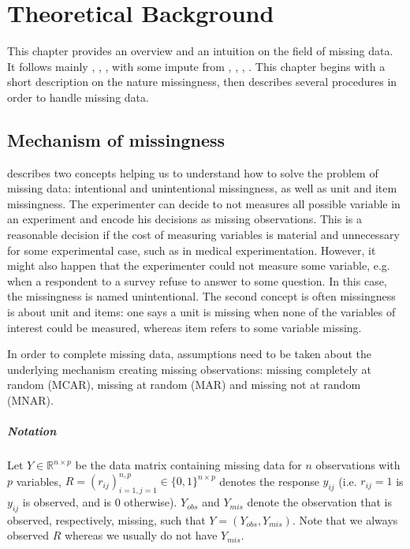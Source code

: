 \chapter{Theoretical Background}

This chapter provides an overview and an intuition on the field of missing
data. It follows mainly \cite{schafer2002missing},
\cite{little2002statistical}, \cite{van2012flexible}, with some impute from
\cite{wikipediaImputation2015}, \cite{matloffblog2015}, \cite{gelman2006data},
\cite{troyanskaya2001missing}. This chapter begins with a short description on
the nature missingness, then describes several procedures in order to handle
missing data.

\section{Mechanism of missingness}
\label{sec:source-missingness}

\cite{van2012flexible} describes two concepts helping us to understand how to
solve the problem of missing data: intentional and unintentional missingness,
as well as unit and item missingness. The experimenter can decide to not
measures all possible variable in an experiment and encode his decisions as
missing observations. This is a reasonable decision if the cost of measuring
variables is material and unnecessary for some experimental case, such as in
medical experimentation. However, it might also happen that the experimenter
could not measure some variable, e.g. when a respondent to a survey refuse to
answer to some question. In this case, the missingness is named
unintentional. The second concept is often missingness is about unit and items:
one says a unit is missing when none of the variables of interest could be
measured, whereas item refers to some variable missing.

In order to complete missing data, assumptions need to be taken about the
underlying mechanism creating missing observations: missing completely at
random (MCAR), missing at random (MAR) and missing not at random (MNAR).

\paragraph{Notation}

Let $Y \in \mathbb{R}^{n\times p}$ be the data matrix containing missing data
for $n$ observations with $p$ variables,
$R = (r_{ij})_{i=1,j=1}^{n,p} \in \{0, 1\}^{n\times p}$ denotes the response
$y_{ij}$ (i.e. $r_{ij} = 1$ is $y_{ij}$ is observed, and is $0$
otherwise). $Y_{obs}$ and $Y_{mis}$ denote the observation that is observed,
respectively, missing, such that $Y=(Y_{obs}, Y_{mis})$. Note that we always
observed $R$ whereas we usually do not have $Y_{mis}$.

